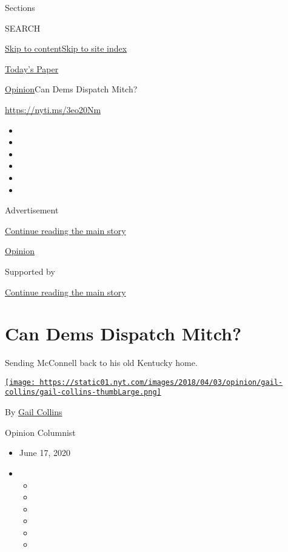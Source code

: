 Sections

SEARCH

\protect\hyperlink{site-content}{Skip to
content}\protect\hyperlink{site-index}{Skip to site index}

\href{https://myaccount.nytimes.com/auth/login?response_type=cookie\&client_id=vi}{}

\href{https://www.nytimes.com/section/todayspaper}{Today's Paper}

\href{/section/opinion}{Opinion}\textbar{}Can Dems Dispatch Mitch?

\href{https://nyti.ms/3eo20Nm}{https://nyti.ms/3eo20Nm}

\begin{itemize}
\item
\item
\item
\item
\item
\item
\end{itemize}

Advertisement

\protect\hyperlink{after-top}{Continue reading the main story}

\href{/section/opinion}{Opinion}

Supported by

\protect\hyperlink{after-sponsor}{Continue reading the main story}

\hypertarget{can-dems-dispatch-mitch}{%
\section{Can Dems Dispatch Mitch?}\label{can-dems-dispatch-mitch}}

Sending McConnell back to his old Kentucky home.

\href{https://www.nytimes.com/by/gail-collins}{\texttt{[image: https://static01.nyt.com/images/2018/04/03/opinion/gail-collins/gail-collins-thumbLarge.png]}}

By \href{https://www.nytimes.com/by/gail-collins}{Gail Collins}

Opinion Columnist

\begin{itemize}
\item
  June 17, 2020
\item
  \begin{itemize}
  \item
  \item
  \item
  \item
  \item
  \item
  \end{itemize}
\end{itemize}

